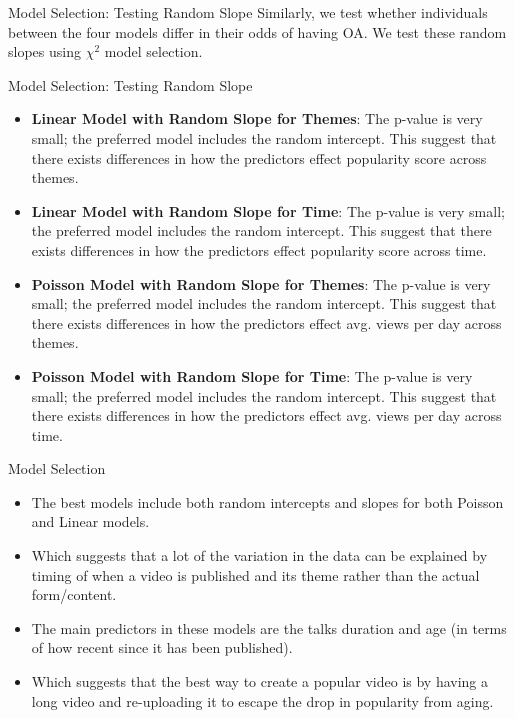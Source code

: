 \begin{frame}{Model Selection: Testing Random Slope}
	Similarly, we test whether individuals between the four models differ in their odds of having OA. We test these random slopes using $\chi^2$ model selection.
    
\end{frame}
\begin{frame}{Model Selection: Testing Random Slope}
\begin{itemize}
	\item \textbf{Linear Model with Random Slope for Themes}: The p-value is very small; the preferred model includes the random intercept. This suggest that there exists differences in how the predictors effect popularity score across themes.
	\item \textbf{Linear Model with Random Slope for Time}: The p-value is very small; the preferred model includes the random intercept. This suggest that there exists differences in how the predictors effect popularity score across time.
	\item \textbf{Poisson Model with Random Slope for Themes}: The p-value is very small; the preferred model includes the random intercept. This suggest that there exists differences in how the predictors effect avg. views per day across themes.
	\item \textbf{Poisson Model with Random Slope for Time}: The p-value is very small; the preferred model includes the random intercept. This suggest that there exists differences in how the predictors effect avg. views per day across time.
\end{itemize}
\end{frame}

\begin{frame}{Model Selection}
	\begin{itemize}
		\item The best models include both random intercepts and slopes for both Poisson and Linear models.
		\item  Which suggests that a lot of the variation in the data can be explained by timing of when a video is published and its theme rather than the actual form/content.
		\item  The main predictors in these models are the talks duration and age (in terms of how recent since it has been published). 
		\item Which suggests that the best way to create a popular video is by having a long video and re-uploading it to escape the drop in popularity from aging.
	\end{itemize}
\end{frame}